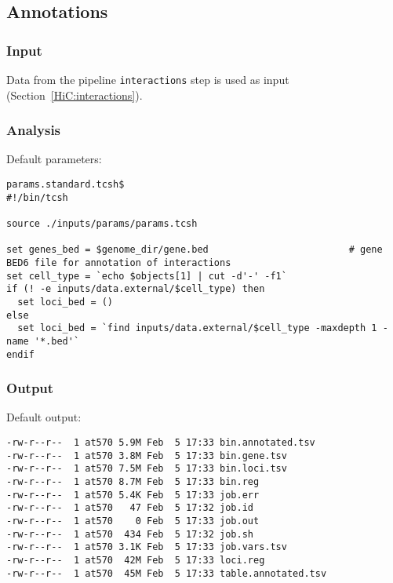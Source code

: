 \subsection{Annotations}\label{HiC:annotations}%
\subsubsection{Input} %
Data from the pipeline \texttt{interactions} step is used as input (Section~\ref{HiC:interactions}).
\subsubsection{Analysis} %
Default parameters:
\begin{lstlisting}
params.standard.tcsh$
#!/bin/tcsh

source ./inputs/params/params.tcsh

set genes_bed = $genome_dir/gene.bed                         # gene BED6 file for annotation of interactions
set cell_type = `echo $objects[1] | cut -d'-' -f1`
if (! -e inputs/data.external/$cell_type) then
  set loci_bed = ()
else
  set loci_bed = `find inputs/data.external/$cell_type -maxdepth 1 -name '*.bed'`
endif
\end{lstlisting}
\subsubsection{Output} %
Default output:
\begin{lstlisting}
-rw-r--r--  1 at570 5.9M Feb  5 17:33 bin.annotated.tsv
-rw-r--r--  1 at570 3.8M Feb  5 17:33 bin.gene.tsv
-rw-r--r--  1 at570 7.5M Feb  5 17:33 bin.loci.tsv
-rw-r--r--  1 at570 8.7M Feb  5 17:33 bin.reg
-rw-r--r--  1 at570 5.4K Feb  5 17:33 job.err
-rw-r--r--  1 at570   47 Feb  5 17:32 job.id
-rw-r--r--  1 at570    0 Feb  5 17:33 job.out
-rw-r--r--  1 at570  434 Feb  5 17:32 job.sh
-rw-r--r--  1 at570 3.1K Feb  5 17:33 job.vars.tsv
-rw-r--r--  1 at570  42M Feb  5 17:33 loci.reg
-rw-r--r--  1 at570  45M Feb  5 17:33 table.annotated.tsv
\end{lstlisting}
% 
\clearpage
